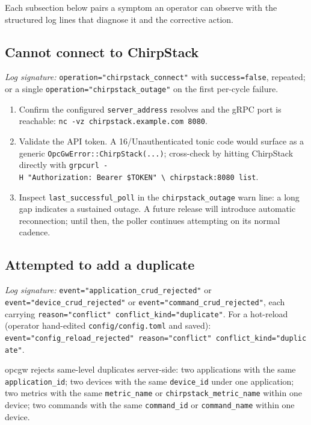 Each subsection below pairs a symptom an operator can observe with the structured log lines that diagnose it and the corrective action.

\subsection{Cannot connect to ChirpStack}\label{sec-issue-chirpstack-connection}

\emph{Log signature:} \texttt{operation="chirpstack\_connect"} with \texttt{success=false}, repeated; or a single \texttt{operation="chirpstack\_outage"} on the first per-cycle failure.

\begin{enumerate}
\def\labelenumi{\arabic{enumi}.}
\item
  Confirm the configured \texttt{server\_address} resolves and the gRPC port is reachable: \texttt{nc\ -vz\ chirpstack.example.com\ 8080}.
\item
  Validate the API token. A 16/Unauthenticated tonic code would surface as a generic \texttt{OpcGwError::ChirpStack(...)}; cross-check by hitting ChirpStack directly with \texttt{grpcurl\ -H\ "Authorization:\ Bearer\ \$TOKEN"\ \textbackslash{}\ chirpstack:8080\ list}.
\item
  Inspect \texttt{last\_successful\_poll} in the \texttt{chirpstack\_outage} warn line: a long gap indicates a sustained outage. A future release will introduce automatic reconnection; until then, the poller continues attempting on its normal cadence.
\end{enumerate}

\subsection{Attempted to add a duplicate}\label{sec-issue-duplicate-rejected}

\emph{Log signature:} \texttt{event="application\_crud\_rejected"} or \texttt{event="device\_crud\_rejected"} or \texttt{event="command\_crud\_rejected"}, each carrying \texttt{reason="conflict"\ conflict\_kind="duplicate"}. For a hot-reload (operator hand-edited \texttt{config/config.toml} and saved): \texttt{event="config\_reload\_rejected"\ reason="conflict"\ conflict\_kind="duplicate"}.

opcgw rejects same-level duplicates server-side: two applications with the same \texttt{application\_id}; two devices with the same \texttt{device\_id} under one application; two metrics with the same \texttt{metric\_name} or \texttt{chirpstack\_metric\_name} within one device; two commands with the same \texttt{command\_id} or \texttt{command\_name} within one device.

